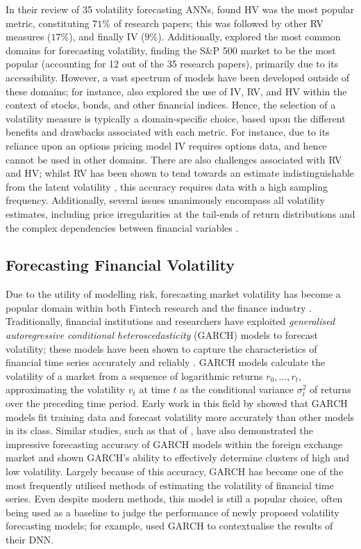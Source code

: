 \documentclass[a4paper, 11pt]{report}
\begin{document}
    In their review of 35 volatility forecasting ANNs, \citet{ge-2022} found HV was the most popular metric, constituting $71\%$ of research papers; this was followed by other RV measures ($17\%$), and finally IV ($9\%$). Additionally, \citet{ge-2022} explored the most common domains for forecasting volatility, finding the S\&P 500 market to be the most popular (accounting for 12 out of the 35 research papers), primarily due to its accessibility. However, a vast spectrum of models have been developed outside of these domains; for instance, \citet{ge-2022} also explored the use of IV, RV, and HV within the context of stocks, bonds, and other financial indices. Hence, the selection of a volatility measure is typically a domain-specific choice, based upon the different benefits and drawbacks associated with each metric. For instance, due to its reliance upon an options pricing model IV requires options data, and hence cannot be used in other domains. There are also challenges associated with RV and HV; whilst RV has been shown to tend towards an estimate indistinguishable from the latent volatility \citep{andersen-2001}, this accuracy requires data with a high sampling frequency. Additionally, several issues unanimously encompass all volatility estimates, including price irregularities at the tail-ends of return distributions \citep{ozbayoglu-2020} and the complex dependencies between financial variables \citep{timmermann-2004}.


    \subsection{Forecasting Financial Volatility}

    Due to the utility of modelling risk, forecasting market volatility has become a popular domain within both Fintech research \citep{ozbayoglu-2020} and the finance industry \citep{chartis-2019}. Traditionally, financial institutions and researchers have exploited \emph{generalised autoregressive conditional heteroscedasticity} (GARCH) models to forecast volatility; these models have been shown to capture the characteristics of financial time series accurately and reliably \citep{lahmiri-2017}. GARCH models calculate the volatility of a market from a sequence of logarithmic returns $r_0, \dots, r_t$, approximating the volatility $v_t$ at time $t$ as the conditional variance $\sigma_{t}^2$ of returns over the preceding time period. Early work in this field by \citet{akgiray-1989} showed that GARCH models fit training data and forecast volatility more accurately than other models in its class. Similar studies, such as that of \citet{hansen-2005}, have also demonstrated the impressive forecasting accuracy of GARCH models within the foreign exchange market and shown GARCH's ability to effectively determine clusters of high and low volatility. Largely because of this accuracy, GARCH has become one of the most frequently utilised methods of estimating the volatility of financial time series. Even despite modern methods, this model is still a popular choice, often being used as a baseline to judge the performance of newly proposed volatility forecasting models; for example, \citet{rodikov-2022} used GARCH to contextualise the results of their DNN.
\end{document}
